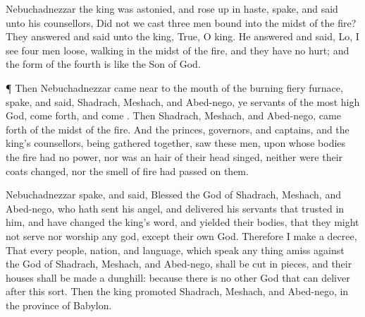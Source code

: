 {Nebuchadnezzar the
king was
astonied, and rose
up in
haste,
{}
spake, and
said unto his
counsellors, Did
not we
cast
three
men
bound into the
midst of the
fire? They
answered and
said unto the
king,
True, O
king.
He
answered and
said,
Lo,
I
see
four
men
loose,
walking in the
midst of the
fire, and they
have
no
hurt; and the
form of the
fourth is
like the
Son of
God.
\par }{\PP {}¶
Then
Nebuchadnezzar came
near to the
mouth of the
burning
fiery
furnace,
{}
spake, and
said,
Shadrach,
Meshach, and
Abed-nego, ye
servants of the most
high
God, come
forth, and
come
{}.
Then
Shadrach,
Meshach, and
Abed-nego, came
forth
of the
midst of the
fire.
And the
princes,
governors, and
captains, and the
king’s
counsellors, being gathered
together,
saw
these
men, upon whose
bodies the
fire had
no
power,
nor was an
hair of their
head
singed,
neither were their
coats
changed,
nor the
smell of
fire had
passed on them.
\par }{\PP {}
Nebuchadnezzar
spake, and
said,
Blessed
{} the
God of
Shadrach,
Meshach, and
Abed-nego, who hath
sent his
angel, and
delivered his
servants that
trusted in
him, and have
changed the
king’s
word, and
yielded their
bodies, that they might
not
serve
nor
worship
any
god,
except their own
God.
Therefore
I
make a
decree, That
every
people,
nation, and
language, which
speak any thing
amiss
against the
God of
Shadrach,
Meshach, and
Abed-nego, shall be
cut in
pieces, and their
houses shall be
made a
dunghill:
because there
is
no
other
God that
can
deliver after
this sort.
Then the
king
promoted
Shadrach,
Meshach, and
Abed-nego, in the
province of
Babylon.

}
